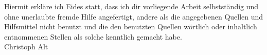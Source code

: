
Hiermit erkl\"are ich Eides statt, dass ich dir vorliegende Arbeit selbstst\"andig und ohne unerlaubte fremde Hilfe angefertigt, andere als die angegebenen Quellen und Hilfsmittel nicht benutzt und die den benutzten Quellen w\"ortlich oder inhaltlich entnommenen Stellen als solche kenntlich gemacht habe. \\
\bigbreak
Christoph Alt